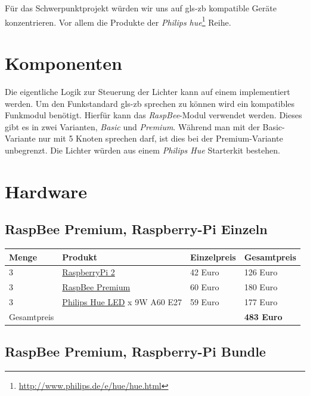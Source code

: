 \documentclass[a4paper,12pt]{article}
\begin{document}
Für das Schwerpunktprojekt würden wir uns auf \gls{gls-zb} kompatible Geräte
konzentrieren. Vor allem die Produkte der \textit{Philips
hue}\footnote{\url{http://www.philips.de/e/hue/hue.html}} Reihe.

\section{Komponenten}
\label{components}

Die eigentliche Logik zur Steuerung der Lichter kann auf einem
\emph{} implementiert werden. Um den Funkstandard
\gls{gls-zb} sprechen zu können wird ein kompatibles Funkmodul benötigt.
Hierfür kann das \textit{RaspBee}-Modul verwendet werden. Dieses gibt es in
zwei Varianten, \textit{Basic} und \textit{Premium}. Während man mit der
Basic-Variante nur mit 5 Knoten sprechen darf, ist dies bei der
Premium-Variante unbegrenzt. Die Lichter würden aus einem \textit{Philips Hue}
Starterkit bestehen.

\section{Hardware}
\label{hardware}

\subsection{RaspBee Premium, Raspberry-Pi Einzeln}

\begin{tabular}{p{2cm}p{4.5cm}p{3cm}p{3cm}}
   Menge & Produkt & Einzelpreis & Gesamtpreis\\
   \hline
   3 & \href{http://www.conrad.de/ce/de/product/1316978/Raspberry-Pi-2-Model-B-1-GB-ohne-Betriebssystem}{RaspberryPi 2} & 42 Euro & 126 Euro\\
   3 & \href{http://www.conrad.de/ce/de/product/1369407/Raspberry-Pi-Erweiterungs-Platine-Zigbee-200-Knotenpunkte-Raspberry-Pi}{RaspBee Premium} & 60 Euro & 180 Euro\\
   3 & \href{http://www.conrad.de/ce/de/product/1314141/Philips-Hue-LED-Leuchtmittel-Erweiterung-E27-9-W-RGB}{Philips Hue LED}
        \newline 1 x 9W A60 E27 & 59 Euro & 177 Euro\\
   \hline
   Gesamtpreis & & & \textbf{483 Euro}\\
\end{tabular}

\subsection{RaspBee Premium, Raspberry-Pi Bundle}
\end{document}
